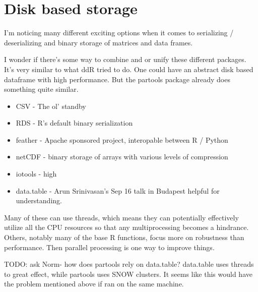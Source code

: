\documentclass[12pt]{article}
\begin{document}
\section{Disk based storage}

I'm noticing many different exciting options when it comes to serializing /
deserializing and binary storage of matrices and data frames.

I wonder if there's some way to combine and or unify these different
packages. It's very similar to what ddR tried to do. One could have an
abstract disk based dataframe with high performance. But the partools package already does
something quite similar. 


\begin{itemize}
    \item CSV - The ol' standby
    \item RDS - R's default binary serialization
    \item feather - Apache sponsored project, interopable between R /
        Python
    \item netCDF - binary storage of arrays with various levels of
        compression
    \item iotools - high 
    \item data.table - Arun Srinivasan's Sep 16 talk in Budapest helpful
        for understanding.

\end{itemize}



Many of these can use threads, which means they can potentially effectively
utilize all the CPU resources so that any multiprocessing becomes a hindrance.
Others, notably many of the base R functions, focus more on robustness than
performance. Then parallel processing is one way to improve things.

TODO: ask Norm- how does partools rely on data.table? data.table uses
threads to great effect, while partools uses SNOW clusters. It seems like
this would have the problem mentioned above if ran on the same machine.


 
\end{document}

